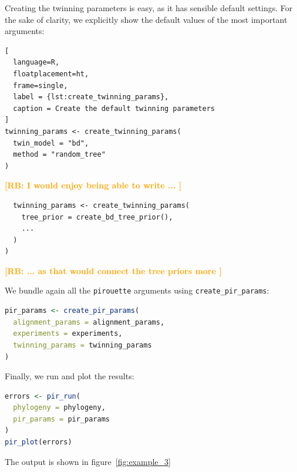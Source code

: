 \documentclass{article}
\newcommand{\richel}[1]{\textcolor{orange}{\textbf{[RB: #1]}}}
\begin{document}
Creating the twinning parameters is easy, as it has sensible default settings.
For the sake of clarity, we explicitly show the default values of the most
important arguments:

\begin{lstlisting}[
  language=R, 
  floatplacement=ht, 
  frame=single,
  label = {lst:create_twinning_params},
  caption = Create the default twinning parameters
]
twinning_params <- create_twinning_params(
  twin_model = "bd", 
  method = "random_tree"
)
\end{lstlisting}

\richel{
  I would enjoy being able to write ...
}
\begin{lstlisting}
  twinning_params <- create_twinning_params(
    tree_prior = create_bd_tree_prior(),
    ...
  )
)
\end{lstlisting}
\richel{
  ... as that would connect the tree priors more
}

We bundle again all the \verb;pirouette; arguments using \verb;create_pir_params;:

\begin{lstlisting}[language=R, floatplacement=ht, frame=single]
pir_params <- create_pir_params(
  alignment_params = alignment_params,
  experiments = experiments,
  twinning_params = twinning_params
)
\end{lstlisting}

Finally, we run and plot the results:

\begin{lstlisting}[language=R, floatplacement=ht, frame=single]
errors <- pir_run(
  phylogeny = phylogeny,
  pir_params = pir_params
)
pir_plot(errors)
\end{lstlisting}

The output is shown in figure~\ref{fig:example_3}
\end{document}
